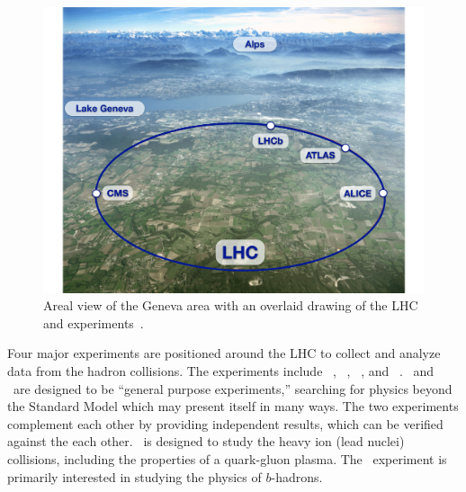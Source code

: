 \begin{figure}[ht]
  \centering
  \includegraphics[width=\textwidth, clip=true, trim=0 0 1cm 0]
    {figs/lhc/lhc_aerial.pdf}
  \caption{
    Areal view of the Geneva area with an overlaid drawing of the LHC
    and experiments~\cite{lhc_aerial}.
  }
  \label{fig:lhc_aerial}
\end{figure}

Four major experiments are positioned around the LHC to collect and analyze
data from the hadron collisions.
The experiments include \atlas~\cite{cern-jinst-atlas},
\cms~\cite{cern-jinst-cms}, \alice~\cite{cern-jinst-alice}, and
\lhcb~\cite{cern-jinst-lhcb}.
\atlas\ and \cms\ are designed to be ``general purpose experiments,'' searching
for physics beyond the Standard Model which may present itself in many ways.
The two experiments complement each other by providing independent results,
which can be verified against the each other.
\alice\ is designed to study the heavy ion (lead nuclei) collisions, 
including the properties of a quark-gluon plasma.
The \lhcb\ experiment is primarily interested in studying the physics of
$b$-hadrons.

\FloatBarrier


